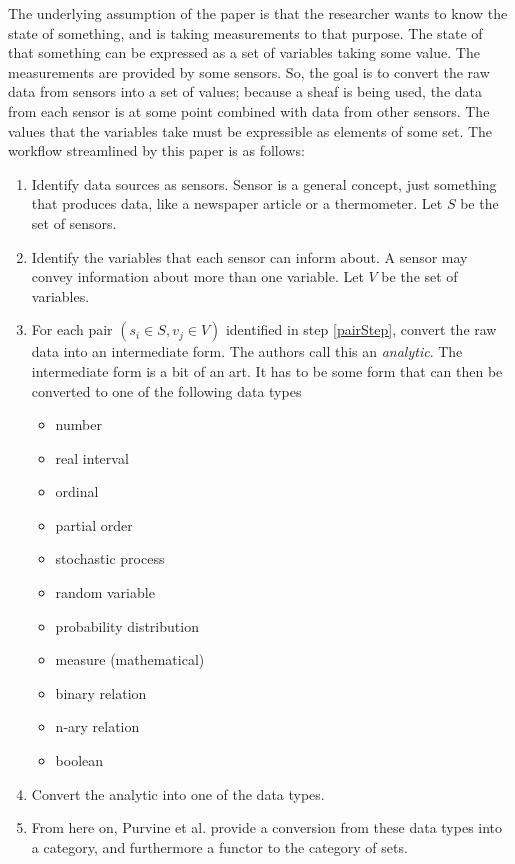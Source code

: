 The underlying assumption of the paper is that the researcher wants to know the
state of something, and is taking measurements to that purpose. The state of
that something can be expressed as a set of variables taking some value. The
measurements are provided by some sensors. So, the goal is to convert the raw
data from sensors into a set of values; because a sheaf is being used, the data
from each sensor is at some point combined with data from other sensors. The
values that the variables take must be expressible as elements of some set.
The workflow streamlined by this paper is as follows:
\begin{enumerate}
	\item Identify data sources as sensors. Sensor is a general concept,
	just something that produces data, like a newspaper article or a
	thermometer. Let $S$ be the set of sensors.
	\item \label{pairStep} Identify the variables that each sensor can
	inform about. A sensor may convey information about more than one
	variable. Let $V$ be the set of variables.
	\item  For each pair $(s_i \in S, v_j \in V)$ identified in step
	\ref{pairStep}, convert the raw data into an intermediate form. The
	authors call this an \emph{analytic}. The intermediate form is a bit of
	an art. It has to be some form that can then be converted to one of the
	following data types 
	\begin{itemize} 
		\item number
		\item real interval
		\item ordinal
		\item partial order
		\item stochastic process
		\item random variable
		\item probability distribution
		\item measure (mathematical)
		\item binary relation
		\item n-ary relation
		\item boolean
	\end{itemize}
	\item Convert the analytic into one of the data types.
	\item From here on, Purvine et al. provide a conversion from these data
	types into a category, and furthermore a functor to the category of
	sets.
\end{enumerate}

